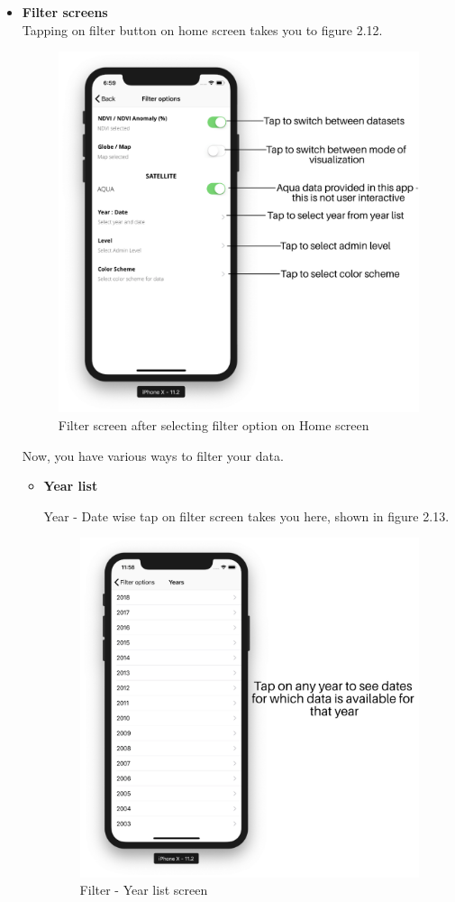 \begin{itemize}
    
   \item \textbf{Filter screens} \\
    Tapping on filter button on home screen takes you to figure 2.12.
    
    \begin{figure}[H]
            \centering
            \includegraphics[width=0.50\linewidth]{figures/ch2/filter_screen.png}
            \caption{\label{fig:filter_screen} Filter screen after selecting filter option on Home screen}
    \end{figure}
    
    Now, you have various ways to filter your data.
   
    \begin{itemize}
        \item \textbf{Year list}
        
        Year - Date wise tap on filter screen takes you here, shown in figure 2.13.
        
         \begin{figure}[H]
            \centering
            \includegraphics[width=0.50\linewidth]{figures/ch2/year_list.png}
            \caption{\label{fig:years_list_screen} Filter - Year list screen}
    \end{figure}
   

\end{itemize}
\end{itemize}
